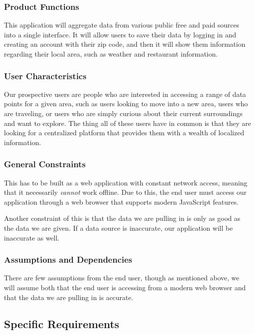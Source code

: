\documentclass[12pt]{article}
\begin{document}
\subsubsection{Product Functions}

This application will aggregate data from various public free and paid sources into a single interface. It will allow users to save their data by logging in and creating an account with their zip code, and then it will show them information regarding their local area, such as weather and restaurant information.

\subsubsection{User Characteristics}

Our prospective users are people who are interested in accessing a range of data points for a given area, such as users looking to move into a new area, users who are traveling, or users who are simply curious about their current surroundings and want to explore. The thing all of these users have in common is that they are looking for a centralized platform that provides them with a wealth of localized information.

\subsubsection{General Constraints}

This has to be built as a web application with constant network access, meaning that it necessarily \textit{cannot} work offline. Due to this, the end user must access our application through a web browser that supports modern JavaScript features.

Another constraint of this is that the data we are pulling in is only as good as the data we are given. If a data source is inaccurate, our application will be inaccurate as well.

\subsubsection{Assumptions and Dependencies}

There are few assumptions from the end user, though as mentioned above, we will assume both that the end user is accessing from a modern web browser and that the data we are pulling in is accurate.

\subsection{Specific Requirements}
\end{document}
